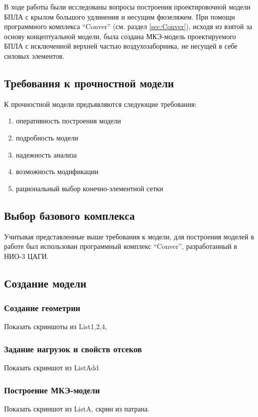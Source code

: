 
В ходе работы были исследованы вопросы построения проектировочной модели БПЛА с крылом большого удлинения и несущим фюзеляжем. При помощи программного комплекса ``Conver'' (см. раздел \ref{sec:Conver}), исходя из взятой за основу концептуальной модели, была создана МКЭ-модель проектируемого БПЛА с исключенной верхней частью воздухозаборника, не несущей в себе силовых элементов. 


\subsection{Требования к прочностной модели}

К прочностной модели предъявляются следующие требования:

\begin{enumerate}
\item оперативность построения модели
\item подробность модели
\item надежность анализа
\item возможность модификации 
\item рациональный выбор конечно-элементной сетки
\end{enumerate}

\subsection{Выбор базового комплекса}
Учитывая представленные выше требования к модели, для построения моделей в работе был использован программный комплекс ``Conver'', разработанный в НИО-3 ЦАГИ. 


\subsection{Создание модели}
\label{sec:creationOfOneModel}
\subsubsection{Создание геометрии}
Показать скриншоты из List1,2,4,
\subsubsection{Задание нагрузок и свойств отсеков}
Показать скриншот из ListAdd
\subsubsection{Построение МКЭ-модели}
Показать скриншот из ListA, скрин из патрана. 

